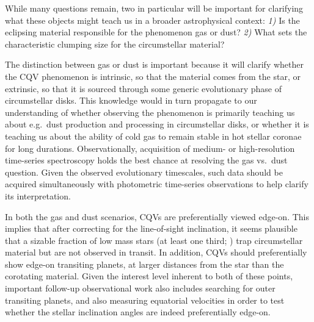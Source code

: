 \documentclass[11pt,twocolumn,tighten]{aastex63}
\begin{document}

While many questions remain, two in particular will be 
important for clarifying what these objects might teach us in a
broader astrophysical context: {\it 1)} Is the eclipsing material
responsible for the phenomenon gas or dust?  {\it 2)} What sets
the characteristic clumping size for the circumstellar material?

The distinction between gas or dust is important because it will
clarify whether the CQV phenomenon is intrinsic, so that the material
comes from the star, or extrinsic, so that it is sourced through some
generic evolutionary phase of circumstellar disks.  This knowledge would in
turn propagate to our understanding of whether observing the
phenomenon is primarily teaching us about e.g.~dust production and
processing in circumstellar disks, or whether it is teaching us about
the ability of cold gas to remain stable in hot stellar coronae for
long durations.
Observationally, acquisition of medium- or high-resolution time-series
spectroscopy holds the best chance at resolving the gas vs.~dust
question.  Given the observed evolutionary timescales, such data
should be acquired simultaneously with photometric time-series
observations to help clarify its interpretation.

In both the gas and dust scenarios, CQVs are preferentially viewed
edge-on.
This implies that after correcting for the line-of-sight inclination,
it seems plausible that a sizable fraction of low mass stars (at
least one third; \citealt{2022AJ....163..144G}) trap circumstellar
material but are not observed in transit.
In addition, CQVs should preferentially show edge-on
transiting planets, at larger distances from the star than the
corotating material.
Given the interest level inherent to both of these points, important follow-up
observational work also includes searching for outer transiting
planets, and also measuring equatorial velocities in
order to test whether the stellar inclination angles are indeed
preferentially edge-on.
\end{document}
